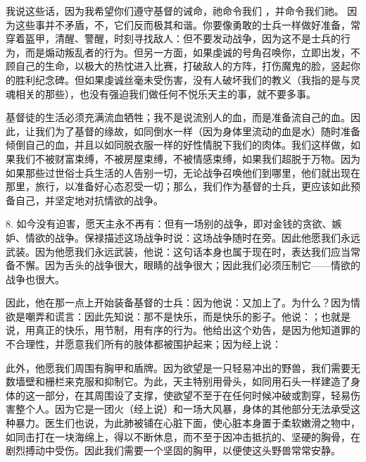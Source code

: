 我说这些话，因为我希望你们遵守基督的诫命，祂命令我们 ，并命令我们祂。 因为这些事并不矛盾，不，它们反而极其和谐。你要像勇敢的士兵一样做好准备，常穿着盔甲，清醒、警醒，时刻寻找敌人：但不要发动战争，因为这不是士兵的行为，而是煽动叛乱者的行为。但另一方面，如果虔诚的号角召唤你，立即出发，不顾自己的生命，以极大的热忱进入比赛，打破敌人的方阵，打伤魔鬼的脸，竖起你的胜利纪念碑。但如果虔诚丝毫未受伤害，没有人破坏我们的教义（我指的是与灵魂相关的那些），也没有强迫我们做任何不悦乐天主的事，就不要多事。\par

基督徒的生活必须充满流血牺牲；我不是说流别人的血，而是准备流自己的血。因此，让我们为了基督的缘故，如同倒水一样（因为身体里流动的血是水）随时准备倾倒自己的血，并且以如同脱衣服一样的好性情脱下我们的肉体。我们这样做，如果我们不被财富束缚，不被房屋束缚，不被情感束缚，如果我们超脱于万物。因为如果那些过世俗士兵生活的人告别一切，无论战争召唤他们到哪里，他们就出现在那里，旅行，以准备好心态忍受一切；那么，我们作为基督的士兵，更应该如此预备自己，并坚定地对抗情欲的战争。\par

8. 如今没有迫害，愿天主永不再有：但有一场别的战争，即对金钱的贪欲、嫉妒、情欲的战争。保禄描述这场战争时说：这场战争随时在旁。因此他愿我们永远武装。因为他愿我们永远武装，他说：这句话本身也属于现在时，表达我们应当常备不懈。因为舌头的战争很大，眼睛的战争很大；因此我们必须压制它——情欲的战争也很大。\par

因此，他在那一点上开始装备基督的士兵：因为他说：又加上了。为什么？因为情欲是嘲弄和谎言：因此先知说：那不是快乐，而是快乐的影子。他说：；也就是说，用真正的快乐，用节制，用有序的行为。他给出这个劝告，是因为他知道罪的不合理性，并愿意我们所有的肢体都被围护起来；因为经上说：\par

此外，他愿我们周围有胸甲和盾牌。因为欲望是一只轻易冲出的野兽，我们需要无数墙壁和栅栏来克服和抑制它。为此，天主特别用骨头，如同用石头一样建造了身体的这一部分，在其周围设了支撑，使欲望不至于在任何时候冲破或割穿，轻易伤害整个人。因为它是一团火（经上说）和一场大风暴，身体的其他部分无法承受这种暴力。医生们也说，为此肺被铺在心脏下面，使心脏本身置于柔软嫩滑之物中，如同击打在一块海绵上，得以不断休息，而不至于因冲击抵抗的、坚硬的胸骨，在剧烈搏动中受伤。因此我们需要一个坚固的胸甲，以便使这头野兽常常安静。\par


